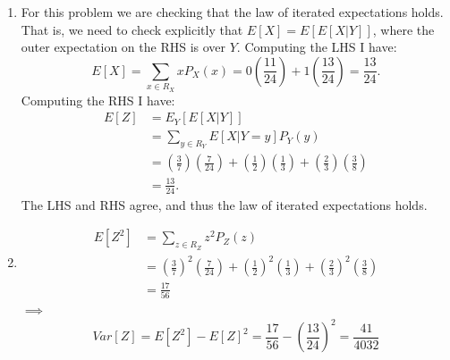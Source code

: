 \begin{problem}{13}
\begin{enumerate}
\item For this problem we are checking that the law of iterated expectations holds.  That is, we need to check explicitly that $E[X] = E[E[X|Y]]$, where the outer expectation on the RHS is over $Y$.  Computing the LHS I have:
\begin{equation*}
E[X] = \sum_{x \in R_X} x P_X(x) = 0\left (\frac{11}{24} \right)+1\left (\frac{13}{24} \right) = \frac{13}{24}.
\end{equation*}
Computing the RHS I have:
\begin{align*}
E[Z] &= E_Y[E[X|Y]] \\
& = \sum_{y \in R_Y} E[X|Y=y] P_Y(y) \\
&=\left ( \frac{3}{7} \right ) \left (\frac{7}{24} \right)+\left ( \frac{1}{2} \right ) \left (\frac{1}{3} \right)+\left ( \frac{2}{3} \right ) \left (\frac{3}{8} \right) \\
& = \frac{13}{24}.
\end{align*}
The LHS and RHS agree, and thus the law of iterated expectations holds.

\item 

\begin{align*}
E[Z^2] &= \sum_{z \in R_Z} z^2 P_Z(z) \\
& = \left ( \frac{3}{7} \right )^2 \left (\frac{7}{24} \right)+\left ( \frac{1}{2} \right )^2 \left (\frac{1}{3} \right)+\left ( \frac{2}{3} \right )^2 \left (\frac{3}{8} \right) \\
& =\frac{17}{56}
\end{align*}
$\implies$
\begin{equation*}
Var[Z] = E[Z^2] - E[Z]^2 =  \frac{17}{56} - \left( \frac{13}{24}\right)^2 =\frac{41}{4032}
\end{equation*}

\end{enumerate}
\end{problem}


